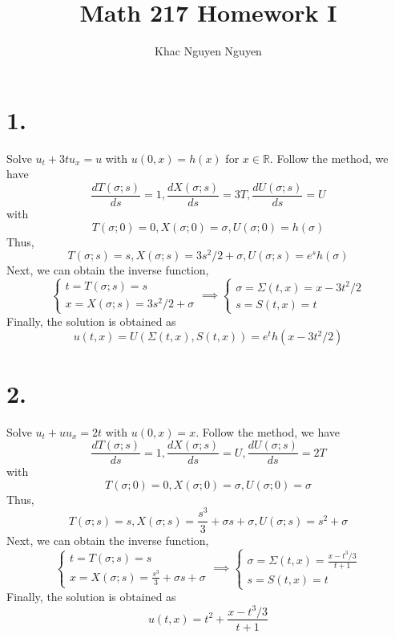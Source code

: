 \documentclass[11pt]{article}
\title{\textbf{Math 217 Homework I}}
\author{Khac Nguyen Nguyen}
\date{}
\theoremstyle{mystyle}
\theoremstyle{definition}
\begin{document}
\section*{1.}
Solve $u_t + 3tu_x = u$ with $u(0,x) = h(x)$ for $x \in \mathbb{R}$.
Follow the method, we have 
\[
  \displaystyle\frac{dT(\sigma; s)}{ds} = 1, 
  \displaystyle\frac{dX(\sigma; s)}{ds} = 3T, 
  \displaystyle\frac{dU(\sigma; s)}{ds} = U
\]
with 
\[
  T(\sigma; 0) = 0, 
  X(\sigma; 0) = \sigma,
  U(\sigma; 0) = h(\sigma)
\]
Thus, 
\[
  T(\sigma; s) = s, X(\sigma;s) = 3s^2/2 + \sigma, U(\sigma; s) = e^s h(\sigma) 
\]
Next, we can obtain the inverse function, 
\[
  \begin{cases}
    t = T(\sigma;s) = s \\
    x = X(\sigma;s) = 3s^2/2 + \sigma
  \end{cases}
  \implies 
  \begin{cases}
    \sigma = \Sigma(t,x) = x - 3t^2/2 \\
    s = S(t,x) = t
  \end{cases}
\]
Finally, the solution is obtained as 
\[
  u(t,x) = U(\Sigma(t,x), S(t,x)) = e^t h(x-3t^2/2) 
\]
\pagebreak
\section*{2.}
Solve $u_t + u u_x = 2t$ with $u(0,x) = x$. 
Follow the method, we have 
\[
  \displaystyle\frac{dT(\sigma; s)}{ds} = 1, 
  \displaystyle\frac{dX(\sigma; s)}{ds} = U, 
  \displaystyle\frac{dU(\sigma; s)}{ds} = 2T
\]
with 
\[
  T(\sigma;0) = 0, X(\sigma;0) = \sigma, U(\sigma;0) = \sigma
\]
Thus, 
\[
  T(\sigma; s) = s, X(\sigma;s) = \displaystyle\frac{s^3}{3} + \sigma s + \sigma , U(\sigma;s) = s^2 + \sigma
\]
Next, we can obtain the inverse function, 
\[
  \begin{cases}
    t = T(\sigma;s) = s \\
    x = X(\sigma;s) = \displaystyle\frac{s^3}{3} + \sigma s + \sigma 
  \end{cases}
  \implies 
  \begin{cases}
    \sigma = \Sigma(t,x) = \frac{x - t^3/3}{t+1} \\
    s = S(t,x) = t
  \end{cases}
\]
Finally, the solution is obtained as 
\[
  u(t,x) = t^2 + \displaystyle\frac{x-t^3/3}{t+1} 
\]
\pagebreak
\end{document}
